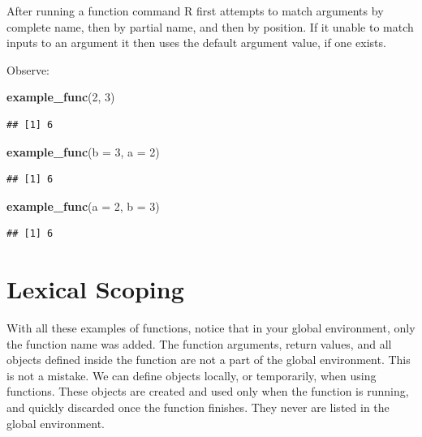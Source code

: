 \documentclass[
]{book}
\newenvironment{Shaded}{\begin{snugshade}}{\end{snugshade}}
\newcommand{\DataTypeTok}[1]{\textcolor[rgb]{0.13,0.29,0.53}{#1}}
\newcommand{\DecValTok}[1]{\textcolor[rgb]{0.00,0.00,0.81}{#1}}
\newcommand{\KeywordTok}[1]{\textcolor[rgb]{0.13,0.29,0.53}{\textbf{#1}}}
\newcommand{\NormalTok}[1]{#1}
\begin{document}
After running a function command R first attempts to match arguments by complete name, then by partial name, and then by position. If it unable to match inputs to an argument it then uses the default argument value, if one exists.

Observe:

\begin{Shaded}
\begin{Highlighting}[]
\KeywordTok{example_func}\NormalTok{(}\DecValTok{2}\NormalTok{, }\DecValTok{3}\NormalTok{)}
\end{Highlighting}
\end{Shaded}

\begin{verbatim}
## [1] 6
\end{verbatim}

\begin{Shaded}
\begin{Highlighting}[]
\KeywordTok{example_func}\NormalTok{(}\DataTypeTok{b =} \DecValTok{3}\NormalTok{, }\DataTypeTok{a =} \DecValTok{2}\NormalTok{)}
\end{Highlighting}
\end{Shaded}

\begin{verbatim}
## [1] 6
\end{verbatim}

\begin{Shaded}
\begin{Highlighting}[]
\KeywordTok{example_func}\NormalTok{(}\DataTypeTok{a =} \DecValTok{2}\NormalTok{, }\DataTypeTok{b =} \DecValTok{3}\NormalTok{)}
\end{Highlighting}
\end{Shaded}

\begin{verbatim}
## [1] 6
\end{verbatim}

\hypertarget{lexical-scoping}{%
\section{Lexical Scoping}\label{lexical-scoping}}

With all these examples of functions, notice that in your global environment, only the function name was added. The function arguments, return values, and all objects defined inside the function are not a part of the global environment. This is not a mistake. We can define objects locally, or temporarily, when using functions. These objects are created and used only when the function is running, and quickly discarded once the function finishes. They never are listed in the global environment.
\end{document}
